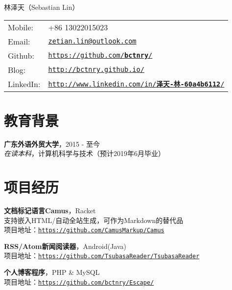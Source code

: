 \documentclass[a4paper]{article}
\def\name{林泽天（Sebastian Lin）}
\renewenvironment{itemize}{
  \begin{list}{}{
    \setlength{\leftmargin}{1.5em}
  }
}{
  \end{list}
}
\begin{document}
{\huge \name}


\vspace{0.15in}

\begin{minipage}{0.45\linewidth}
  \begin{tabular}{ll}
    Mobile: & +86 13022015023 \\
    Email: & \href{mailto:zetian.lin@outlook.com}{\tt zetian.lin@outlook.com} \\
    Github: & \href{https://github.com/bctnry/}{\tt https://github.com/\textbf{bctnry}/} \\
    Blog: & \href{http://bctnry.github.io/}{\tt http://bctnry.github.io/} \\
    LinkedIn: & \href{http://www.linkedin.com/in/泽天-林-60a4b6112/}{\tt http://www.linkedin.com/in/\textbf{泽天-林-60a4b6112}/} \\
  \end{tabular}
\end{minipage}



\section*{教育背景}

\begin{itemize}
  \item{\textbf{广东外语外贸大学}，2015 - 至今\\\textit{在读本科}，计算机科学与技术（预计2019年6月毕业）}
\end{itemize}



\section*{项目经历}

\begin{itemize}
\item{
    \textbf{文档标记语言Camus}，Racket\\
    支持嵌入HTML/自动全站生成，可作为Markdown的替代品\\
    项目地址：\href{https://github.com/CamusMarkup/Camus}{\tt https://github.com/CamusMarkup/Camus}
  }
\item{
    \textbf{RSS/Atom新闻阅读器}，Android(Java)\\
    项目地址：\href{https://github.com/TsubasaReader/TsubasaReader}{\tt https://github.com/TsubasaReader/TsubasaReader}
  }
\item{
    \textbf{个人博客程序}，PHP \& MySQL\\
    项目地址：\href{https://github.com/bctnry/Escape/}{\tt https://github.com/bctnry/Escape/}
  }
\end{itemize}
  
\end{document}

